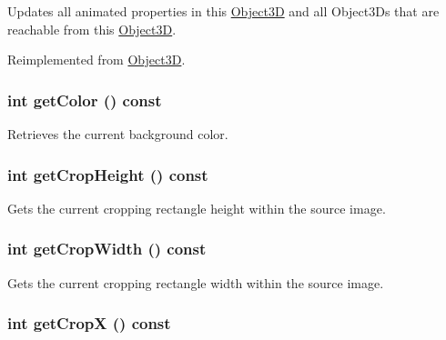 Updates all animated properties in this \hyperlink{classm3g_1_1Object3D}{Object3D} and all Object3Ds that are reachable from this \hyperlink{classm3g_1_1Object3D}{Object3D}. 

Reimplemented from \hyperlink{classm3g_1_1Object3D_8aad1ceab4c2a03609c8a42324ce484d}{Object3D}.\hypertarget{classm3g_1_1Background_4cfa1931c265ec3412fe3f6408a1b4f5}{
\subsubsection[{getColor}]{\setlength{\rightskip}{0pt plus 5cm}int getColor () const}}
\label{classm3g_1_1Background_4cfa1931c265ec3412fe3f6408a1b4f5}


Retrieves the current background color. \hypertarget{classm3g_1_1Background_d6d9d6f23b7bb004c93642bcd081f4a3}{
\subsubsection[{getCropHeight}]{\setlength{\rightskip}{0pt plus 5cm}int getCropHeight () const}}
\label{classm3g_1_1Background_d6d9d6f23b7bb004c93642bcd081f4a3}


Gets the current cropping rectangle height within the source image. \hypertarget{classm3g_1_1Background_5c6515f6706675ef31ca5dfa0a03b953}{
\subsubsection[{getCropWidth}]{\setlength{\rightskip}{0pt plus 5cm}int getCropWidth () const}}
\label{classm3g_1_1Background_5c6515f6706675ef31ca5dfa0a03b953}


Gets the current cropping rectangle width within the source image. \hypertarget{classm3g_1_1Background_d0ba0211183decc8f0459ca598b12912}{
\subsubsection[{getCropX}]{\setlength{\rightskip}{0pt plus 5cm}int getCropX () const}}
\label{classm3g_1_1Background_d0ba0211183decc8f0459ca598b12912}


